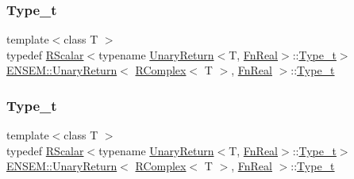\subsubsection{\texorpdfstring{Type\_t}{Type\_t}\hspace{0.1cm}{\footnotesize\ttfamily [1/3]}}
{\footnotesize\ttfamily template$<$class T $>$ \\
typedef \mbox{\hyperlink{classENSEM_1_1RScalar}{R\+Scalar}}$<$typename \mbox{\hyperlink{structENSEM_1_1UnaryReturn}{Unary\+Return}}$<$T, \mbox{\hyperlink{structENSEM_1_1FnReal}{Fn\+Real}}$>$\+::\mbox{\hyperlink{structENSEM_1_1UnaryReturn_3_01RComplex_3_01T_01_4_00_01FnReal_01_4_a2495b3d7e3cfcf3f84d7bbf892bbfd3c}{Type\+\_\+t}}$>$ \mbox{\hyperlink{structENSEM_1_1UnaryReturn}{E\+N\+S\+E\+M\+::\+Unary\+Return}}$<$ \mbox{\hyperlink{classENSEM_1_1RComplex}{R\+Complex}}$<$ T $>$, \mbox{\hyperlink{structENSEM_1_1FnReal}{Fn\+Real}} $>$\+::\mbox{\hyperlink{structENSEM_1_1UnaryReturn_3_01RComplex_3_01T_01_4_00_01FnReal_01_4_a2495b3d7e3cfcf3f84d7bbf892bbfd3c}{Type\+\_\+t}}}

\mbox{\label{structENSEM_1_1UnaryReturn_3_01RComplex_3_01T_01_4_00_01FnReal_01_4_a2495b3d7e3cfcf3f84d7bbf892bbfd3c}} 
\subsubsection{\texorpdfstring{Type\_t}{Type\_t}\hspace{0.1cm}{\footnotesize\ttfamily [2/3]}}
{\footnotesize\ttfamily template$<$class T $>$ \\
typedef \mbox{\hyperlink{classENSEM_1_1RScalar}{R\+Scalar}}$<$typename \mbox{\hyperlink{structENSEM_1_1UnaryReturn}{Unary\+Return}}$<$T, \mbox{\hyperlink{structENSEM_1_1FnReal}{Fn\+Real}}$>$\+::\mbox{\hyperlink{structENSEM_1_1UnaryReturn_3_01RComplex_3_01T_01_4_00_01FnReal_01_4_a2495b3d7e3cfcf3f84d7bbf892bbfd3c}{Type\+\_\+t}}$>$ \mbox{\hyperlink{structENSEM_1_1UnaryReturn}{E\+N\+S\+E\+M\+::\+Unary\+Return}}$<$ \mbox{\hyperlink{classENSEM_1_1RComplex}{R\+Complex}}$<$ T $>$, \mbox{\hyperlink{structENSEM_1_1FnReal}{Fn\+Real}} $>$\+::\mbox{\hyperlink{structENSEM_1_1UnaryReturn_3_01RComplex_3_01T_01_4_00_01FnReal_01_4_a2495b3d7e3cfcf3f84d7bbf892bbfd3c}{Type\+\_\+t}}}

